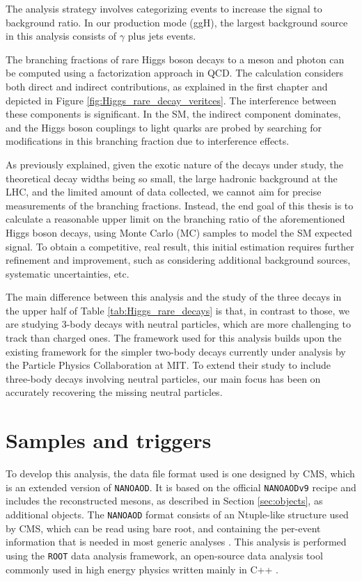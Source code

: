 The analysis strategy involves categorizing events to increase the signal to background ratio. In our production mode (ggH), the largest background source in this analysis consists of $\gamma$ plus jets events.

The branching fractions of rare Higgs boson decays to a meson and photon can be computed using a factorization approach in QCD. The calculation considers both direct and indirect contributions, as explained in the first chapter and depicted in Figure \ref{fig:Higgs_rare_decay_veritces}. The interference between these components is significant. In the SM, the indirect component dominates, and the Higgs boson couplings to light quarks are probed by searching for modifications in this branching fraction due to interference effects.

As previously explained, given the exotic nature of the decays under study, the theoretical decay widths being so small, the large hadronic background at the LHC, and the limited amount of data collected, we cannot aim for precise measurements of the branching fractions. Instead, the end goal of this thesis is to calculate a reasonable upper limit on the branching ratio of the aforementioned Higgs boson decays, using Monte Carlo (MC) samples to model the SM expected signal. To obtain a competitive, real result, this initial estimation requires further refinement and improvement, such as considering additional background sources, systematic uncertainties, etc.

The main difference between this analysis and the study of the three decays in the upper half of Table \ref{tab:Higgs_rare_decays} is that, in contrast to those, we are studying 3-body decays with neutral particles, which are more challenging to track than charged ones. The framework used for this analysis builds upon the existing framework for the simpler two-body decays currently under analysis by the Particle Physics Collaboration at MIT. To extend their study to include three-body decays involving neutral particles, our main focus has been on accurately recovering the missing neutral particles.

\section{Samples and triggers}\label{sec:samples_triggers}

To develop this analysis, the data file format used is one designed by CMS, which is an extended version of \verb+NANOAOD+. It is based on the official \verb+NANOAODv9+ recipe and includes the reconstructed mesons, as described in Section \ref{sec:objects}, as additional objects. The \verb+NANOAOD+ format consists of an Ntuple-like structure used by CMS, which can be read using bare root, and containing the per-event information that is needed in most generic analyses \cite{CMS:NanoAOD}. This analysis is performed using the \verb+ROOT+ data analysis framework, an open-source data analysis tool commonly used in high energy physics written mainly in C++ \cite{CERN:root}.

